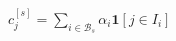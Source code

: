 \documentclass[border=1pt]{standalone}
\begin{document}
\color{navy}
\(\displaystyle
  c_j^{[s]}=\sum_{i\in\mathcal{B}_s}\alpha_i\mathbf{1}[j\in I_i]
\)
\end{document}
